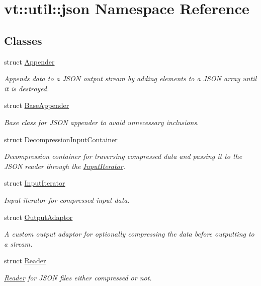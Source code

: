 \hypertarget{namespacevt_1_1util_1_1json}{}\section{vt\+:\+:util\+:\+:json Namespace Reference}
\label{namespacevt_1_1util_1_1json}
\subsection*{Classes}
\begin{DoxyCompactItemize}
\item 
struct \hyperlink{structvt_1_1util_1_1json_1_1_appender}{Appender}
\begin{DoxyCompactList}\small\item\em Appends data to a J\+S\+ON output stream by adding elements to a J\+S\+ON array until it is destroyed. \end{DoxyCompactList}\item 
struct \hyperlink{structvt_1_1util_1_1json_1_1_base_appender}{Base\+Appender}
\begin{DoxyCompactList}\small\item\em Base class for J\+S\+ON appender to avoid unnecessary inclusions. \end{DoxyCompactList}\item 
struct \hyperlink{structvt_1_1util_1_1json_1_1_decompression_input_container}{Decompression\+Input\+Container}
\begin{DoxyCompactList}\small\item\em Decompression container for traversing compressed data and passing it to the J\+S\+ON reader through the {\ttfamily \hyperlink{structvt_1_1util_1_1json_1_1_input_iterator}{Input\+Iterator}}. \end{DoxyCompactList}\item 
struct \hyperlink{structvt_1_1util_1_1json_1_1_input_iterator}{Input\+Iterator}
\begin{DoxyCompactList}\small\item\em Input iterator for compressed input data. \end{DoxyCompactList}\item 
struct \hyperlink{structvt_1_1util_1_1json_1_1_output_adaptor}{Output\+Adaptor}
\begin{DoxyCompactList}\small\item\em A custom output adaptor for optionally compressing the data before outputting to a stream. \end{DoxyCompactList}\item 
struct \hyperlink{structvt_1_1util_1_1json_1_1_reader}{Reader}
\begin{DoxyCompactList}\small\item\em \hyperlink{structvt_1_1util_1_1json_1_1_reader}{Reader} for J\+S\+ON files either compressed or not. \end{DoxyCompactList}\end{DoxyCompactItemize}
